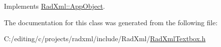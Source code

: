 Implements \hyperlink{class_rad_xml_1_1_app_object_a677e0af301973343665699f6d07f2018}{Rad\-Xml\-::\-App\-Object}.



The documentation for this class was generated from the following file\-:\begin{DoxyCompactItemize}
\item 
C\-:/editing/c/projects/radxml/include/\-Rad\-Xml/\hyperlink{_rad_xml_textbox_8h}{Rad\-Xml\-Textbox.\-h}\end{DoxyCompactItemize}
